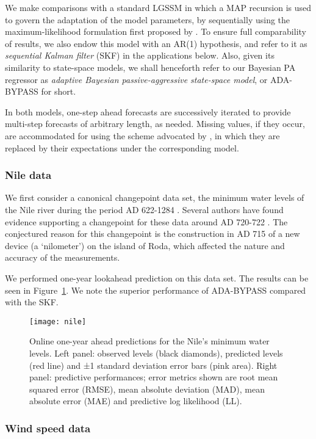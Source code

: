 We make comparisons with a standard LGSSM in which a MAP recursion is used to govern the adaptation of the model parameters, by sequentially using the maximum-likelihood formulation first proposed by \citet{jazwinski70}. To ensure full comparability of results, we also endow this model with an AR(1) hypothesis, and refer to it as \emph{sequential Kalman filter} (SKF) in the applications below. Also, given its similarity to state-space models, we shall henceforth refer to our Bayesian PA regressor as \emph{adaptive Bayesian passive-aggressive state-space model}, or  ADA-BYPASS for short.

In both models, one-step ahead forecasts are successively iterated to provide multi-step forecasts of arbitrary length, as needed. Missing values, if they occur, are accommodated for using the scheme advocated by \citet{shumway11}, in which they are replaced by their expectations under the corresponding model.

\subsubsection{Nile data}

We first consider a canonical changepoint data set, the minimum water levels of the Nile river during the period AD 622-1284 \citep{whitcher02}. Several authors have found evidence supporting a changepoint for these data around AD 720-722 \citep{whitcher02, garnett10, ray02}. The conjectured reason for this changepoint is the construction in AD 715 of a new device (a `nilometer') on the island of Roda, which affected the nature and accuracy of the measurements.

We performed one-year lookahead prediction on this data set. The results can be seen in Figure~\ref{fig:nile}. We note the superior performance of ADA-BYPASS compared with the SKF.
\begin{figure}[H]
\centering
\texttt{[image: nile]}
\caption{Online one-year ahead predictions for the Nile’s minimum water levels. Left panel: observed levels (black diamonds), predicted levels (red line) and ±1 standard deviation error bars
(pink area). Right panel: predictive performances; error metrics shown are root mean squared error (RMSE), mean absolute deviation (MAD), mean absolute error (MAE) and predictive log likelihood
(LL).}
\label{fig:nile}
\end{figure}

\subsubsection{Wind speed data}

